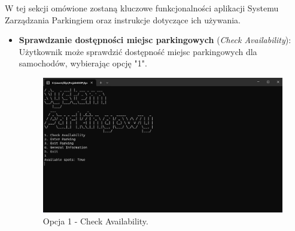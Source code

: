 W tej sekcji omówione zostaną kluczowe funkcjonalności aplikacji Systemu Zarządzania Parkingiem oraz instrukcje dotyczące ich używania.

\begin{itemize}
    \item \textbf{Sprawdzanie dostępności miejsc parkingowych} (\textit{Check Availability}):
    Użytkownik może sprawdzić dostępność miejsc parkingowych dla samochodów, wybierając opcję "1". 

    \begin{figure}[H]
    \centering
    \includegraphics[width=\textwidth]{photos/avail.png}
    \caption{Opcja 1 - Check Availability.}
    \end{figure}


\end{itemize}
